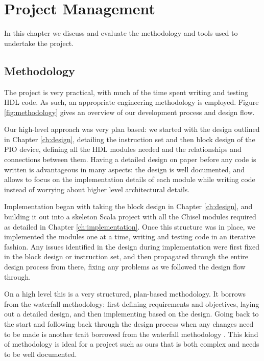\chapter{Project Management}
\label{ch:projman}

In this chapter we discuss and evaluate the methodology and tools used to undertake the project.

\section{Methodology}
The project is very practical, with much of the time spent writing and testing HDL code. As such, an appropriate engineering methodology is employed. Figure \ref{fig:methodology} gives an overview of our development process and design flow.

Our high-level approach was very plan based: we started with the design outlined in Chapter \ref{ch:design}, detailing the instruction set and then block design of the PIO device, defining all the HDL modules needed and the relationships and connections between them. Having a detailed design on paper before any code is written is advantageous in many aspects: the design is well documented, and allows to focus on the implementation details of each module while writing code instead of worrying about higher level architectural details.

Implementation began with taking the block design in Chapter \ref{ch:design}, and building it out into a skeleton Scala project with all the Chisel modules required as detailed in Chapter \ref{ch:implementation}. Once this structure was in place, we implemented the modules one at a time, writing and testing code in an iterative fashion. Any issues identified in the design during implementation were first fixed in the block design or instruction set, and then propagated through the entire design process from there, fixing any problems as we followed the design flow through.

On a high level this is a very structured, plan-based methodology. It borrows from the waterfall methodology: first defining requirements and objectives, laying out a detailed design, and then implementing based on the design. Going back to the start and following back through the design process when any changes need to be made is another trait borrowed from the waterfall methodology \cite{softeng}. This kind of methodology is ideal for a project such as ours that is both complex and needs to be well documented.

